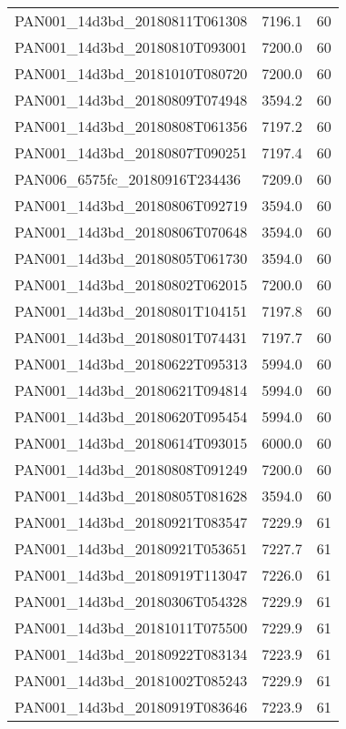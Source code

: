 \begin{tabular}{lrr}
PAN001\_14d3bd\_20180811T061308 &     7196.1 &       60 \\
PAN001\_14d3bd\_20180810T093001 &     7200.0 &       60 \\
PAN001\_14d3bd\_20181010T080720 &     7200.0 &       60 \\
PAN001\_14d3bd\_20180809T074948 &     3594.2 &       60 \\
PAN001\_14d3bd\_20180808T061356 &     7197.2 &       60 \\
PAN001\_14d3bd\_20180807T090251 &     7197.4 &       60 \\
PAN006\_6575fc\_20180916T234436 &     7209.0 &       60 \\
PAN001\_14d3bd\_20180806T092719 &     3594.0 &       60 \\
PAN001\_14d3bd\_20180806T070648 &     3594.0 &       60 \\
PAN001\_14d3bd\_20180805T061730 &     3594.0 &       60 \\
PAN001\_14d3bd\_20180802T062015 &     7200.0 &       60 \\
PAN001\_14d3bd\_20180801T104151 &     7197.8 &       60 \\
PAN001\_14d3bd\_20180801T074431 &     7197.7 &       60 \\
PAN001\_14d3bd\_20180622T095313 &     5994.0 &       60 \\
PAN001\_14d3bd\_20180621T094814 &     5994.0 &       60 \\
PAN001\_14d3bd\_20180620T095454 &     5994.0 &       60 \\
PAN001\_14d3bd\_20180614T093015 &     6000.0 &       60 \\
PAN001\_14d3bd\_20180808T091249 &     7200.0 &       60 \\
PAN001\_14d3bd\_20180805T081628 &     3594.0 &       60 \\
PAN001\_14d3bd\_20180921T083547 &     7229.9 &       61 \\
PAN001\_14d3bd\_20180921T053651 &     7227.7 &       61 \\
PAN001\_14d3bd\_20180919T113047 &     7226.0 &       61 \\
PAN001\_14d3bd\_20180306T054328 &     7229.9 &       61 \\
PAN001\_14d3bd\_20181011T075500 &     7229.9 &       61 \\
PAN001\_14d3bd\_20180922T083134 &     7223.9 &       61 \\
PAN001\_14d3bd\_20181002T085243 &     7229.9 &       61 \\
PAN001\_14d3bd\_20180919T083646 &     7223.9 &       61 \\

\end{tabular}
